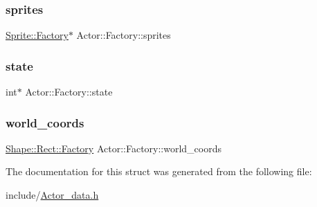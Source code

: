 \mbox{\label{struct_actor_1_1_factory_a18ce1413dd0b29ed6aef0a06c6105739}} 
\subsubsection{\texorpdfstring{sprites}{sprites}}
{\footnotesize\ttfamily \mbox{\hyperlink{struct_sprite_1_1_factory}{Sprite\+::\+Factory}}$\ast$ Actor\+::\+Factory\+::sprites}

\mbox{\label{struct_actor_1_1_factory_a6c786b3ba6c2e37c5ae1ba949e34294a}} 
\subsubsection{\texorpdfstring{state}{state}}
{\footnotesize\ttfamily int$\ast$ Actor\+::\+Factory\+::state}

\mbox{\label{struct_actor_1_1_factory_a1e08690a49b6594d2e78089ce3bc9362}} 
\subsubsection{\texorpdfstring{world\+\_\+coords}{world\_coords}}
{\footnotesize\ttfamily \mbox{\hyperlink{struct_shape_1_1_rect_1_1_factory}{Shape\+::\+Rect\+::\+Factory}} Actor\+::\+Factory\+::world\+\_\+coords}



The documentation for this struct was generated from the following file\+:\begin{DoxyCompactItemize}
\item 
include/\mbox{\hyperlink{_actor__data_8h}{Actor\+\_\+data.\+h}}\end{DoxyCompactItemize}
